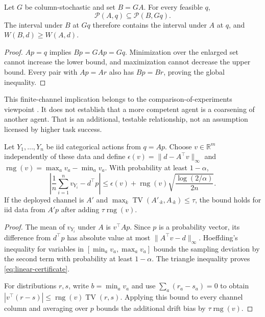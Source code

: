 \begin{theorem}[Coarsening]
\label{thm:coarsening}
Let $G$ be column-stochastic and set $B=GA$. For every feasible $q$,
\[
 \mathcal P(A,q)\subseteq\mathcal P(B,Gq).
\]
The interval under $B$ at $Gq$ therefore contains the interval under $A$ at $q$,
and $W(B,d)\geq W(A,d)$.
\end{theorem}
\begin{proof}
$Ap=q$ implies $Bp=GAp=Gq$. Minimization over the enlarged set cannot increase
the lower bound, and maximization cannot decrease the upper bound. Every pair
with $Ap=Ar$ also has $Bp=Br$, proving the global inequality.
\end{proof}

This finite-channel implication belongs to the comparison-of-experiments
viewpoint \citep{blackwell1953}. It does not establish that a more competent
agent is a coarsening of another agent. That is an additional, testable
relationship, not an assumption licensed by higher task success.

\begin{theorem}
\label{thm:linear-certificate}
Let $Y_1,\ldots,Y_n$ be iid categorical actions from $q=Ap$. Choose
$v\in\mathbb R^m$ independently of these data and define
$\epsilon(v)=\|d-A^\top v\|_\infty$ and
$\operatorname{rng}(v)=\max_a v_a-\min_a v_a$.
With probability at least $1-\alpha$,
\begin{equation}
\label{eq:linear-certificate}
 \left|\frac1n\sum_{i=1}^n v_{Y_i}-d^\top p\right|
 \leq \epsilon(v)+\operatorname{rng}(v)
       \sqrt{\frac{\log(2/\alpha)}{2n}}.
\end{equation}
If the deployed channel is $A'$ and
$\max_k\operatorname{TV}(A'_{\cdot k},A_{\cdot k})\leq\tau$, the bound holds
for iid data from $A'p$ after adding $\tau\operatorname{rng}(v)$.
\end{theorem}
\begin{proof}
The mean of $v_{Y_i}$ under $A$ is $v^\top Ap$. Since $p$ is a probability
vector, its difference from $d^\top p$ has absolute value at most
$\|A^\top v-d\|_\infty$. Hoeffding's inequality for variables in
$[\min_a v_a,\max_a v_a]$ bounds the sampling deviation by the second term
with probability at least $1-\alpha$. The triangle inequality proves
\eqref{eq:linear-certificate}.

For distributions $r,s$, write $b=\min_a v_a$ and use
$\sum_a(r_a-s_a)=0$ to obtain
$|v^\top(r-s)|\leq\operatorname{rng}(v)\operatorname{TV}(r,s)$.
Applying this bound to every channel column and averaging over $p$ bounds the
additional drift bias by $\tau\operatorname{rng}(v)$.
\end{proof}

